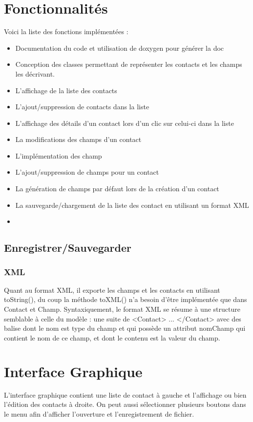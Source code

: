 \documentclass{report}
\begin{document}
\chapter{Fonctionnalités}
Voici la liste des fonctions implémentées :
\begin{itemize}
\item Documentation du code  et utilisation de doxygen pour
générer la doc
\item Conception des classes permettant de représenter les contacts et les champs
les décrivant.
\item L'affichage de la liste des contacts
\item L'ajout/suppression de contacts dans la liste
\item L'affichage des détails d’un contact lors d’un clic sur celui-ci dans la liste
\item La modifications des champs d’un contact
\item L'implémentation  des champ
\item L'ajout/suppression de champs pour un contact
\item La génération de champs par défaut lors de la création d’un contact
\item La sauvegarde/chargement  de la liste des contact en utilisant un format XML
\item
\end{itemize}
\section{Enregistrer/Sauvegarder}
\subsection{XML}
Quant au format XML, il exporte les champs et les contacts en utilisant
toString(), du coup la méthode toXML() n’a besoin d’être implémentée que dans
Contact et Champ.
Syntaxiquement, le format XML se résume à une structure semblable à celle
du modèle : une suite de <Contact> ... </Contact> avec des balise dont le nom est type du champ et qui possède un attribut nomChamp qui contient le nom de ce champ, et dont le contenu est la valeur du champ.

\chapter{Interface Graphique}
L’interface graphique contient une liste de contact à gauche et l'affichage ou
bien l’édition des contacts à droite. On peut aussi sélectionner plusieurs boutons
dans le menu afin d'afficher l'ouverture et l'enregistrement de fichier.
\end{document}
